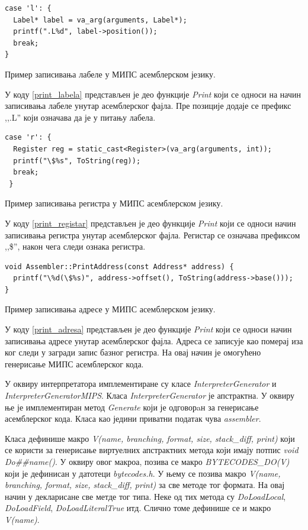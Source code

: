 \documentclass[12pt,oneside]{memoir}
\begin{document}
\begin{listing}
\begin{verbatim}
case 'l': {
  Label* label = va_arg(arguments, Label*);
  printf(".L%d", label->position());
  break;
}
\end{verbatim}
\caption{Пример записивања лабеле у МИПС асемблерском језику.}
\label{print_labela}
\end{listing}

У коду \ref{print_labela} представљен је део функције \textit{Print} који се односи на начин записивања лабеле унутар асемблерског фајла. Пре позиције додаје се префикс ,,.L'' који означава да је у питању лабела.

\begin{listing}
\begin{verbatim}
case 'r': {
  Register reg = static_cast<Register>(va_arg(arguments, int));
  printf("\$%s", ToString(reg));
  break;
 }
\end{verbatim}
\caption{Пример записивања регистра у МИПС асемблерском језику.}
\label{print_registar}
\end{listing}
У коду \ref{print_registar} представљен је део функције \textit{Print} који се односи начин записивања регистра унутар асемблерског фајла. Регистар се означава префиксом ,,\$'', након чега следи ознака регистра.

\begin{listing}
\begin{verbatim}
void Assembler::PrintAddress(const Address* address) {
  printf("\%d(\$%s)", address->offset(), ToString(address->base()));
}
\end{verbatim}
\caption{Пример записивања адресе у МИПС асемблерском језику.}
\label{print_adresa}
\end{listing}
У коду \ref{print_adresa} представљен је део функције \textit{Print} који се односи начин записивања адресе унутар асемблерског фајла. Адреса се записује као померај иза ког следи у загради запис базног регистра. На овај начин је омогућено генерисање МИПС асемблерског кода. 

У оквиру интерпретатора имплементиране су класе \textit{InterpreterGenerator} и \textit{InterpreterGeneratorMIPS}. Класа \textit{InterpreterGenerator} је апстрактна. У оквиру ње је имплементиран метод \textit{Generate} који је одговорaн за генерисање асемблерског кода. Класа као једини приватни податак чува \textit{assembler}.

Класа дефинише макро \textit{V(name, branching, format, size, stack\_diff, print)} који се користи за генерисање виртуелних апстрактних метода који имају потпис \textit{void Do\#\#name()}. У оквиру овог макроа, позива се макро \textit{BYTECODES\_DO(V)} који је дефинисан у датотеци \textit{bytecodes.h}. У њему се позива макро \textit{V(name, branching, format, size, stack\_diff, print)} за све методе тог формата. На овај начин у декларисане све метде тог типа. Неке од тих метода су \textit{DoLoadLocal}, \textit{DoLoadField}, \textit{DoLoadLiteralTrue} итд. Слично томе дефинише се и макро \textit{V(name)}.
\end{document}
